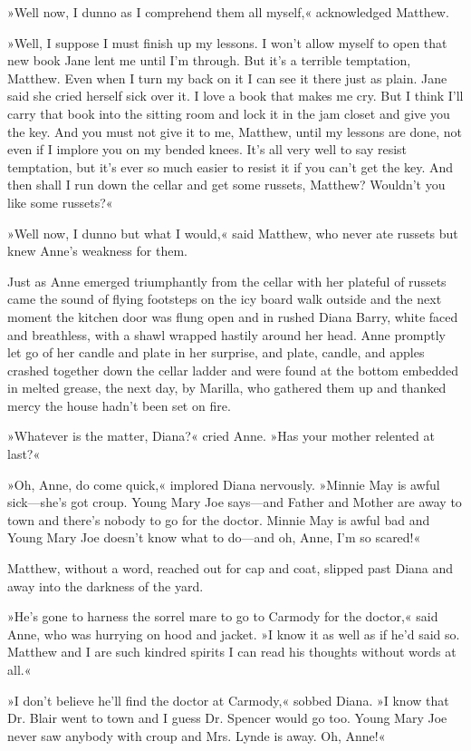 »Well now, I dunno as I comprehend them all myself,« acknowledged Matthew.

»Well, I suppose I must finish up my lessons. I won’t allow myself to open that new book Jane lent me until I’m through. But it’s a terrible temptation, Matthew. Even when I turn my back on it I can see it there just as plain. Jane said she cried herself sick over it. I love a book that makes me cry. But I think I’ll carry that book into the sitting room and lock it in the jam closet and give you the key. And you must not give it to me, Matthew, until my lessons are done, not even if I implore you on my bended knees. It’s all very well to say resist temptation, but it’s ever so much easier to resist it if you can’t get the key. And then shall I run down the cellar and get some russets, Matthew? Wouldn’t you like some russets?«

»Well now, I dunno but what I would,« said Matthew, who never ate russets but knew Anne’s weakness for them.

Just as Anne emerged triumphantly from the cellar with her plateful of russets came the sound of flying footsteps on the icy board walk outside and the next moment the kitchen door was flung open and in rushed Diana Barry, white faced and breathless, with a shawl wrapped hastily around her head. Anne promptly let go of her candle and plate in her surprise, and plate, candle, and apples crashed together down the cellar ladder and were found at the bottom embedded in melted grease, the next day, by Marilla, who gathered them up and thanked mercy the house hadn’t been set on fire.

»Whatever is the matter, Diana?« cried Anne. »Has your mother relented at last?«

»Oh, Anne, do come quick,« implored Diana nervously. »Minnie May is awful sick—she’s got croup. Young Mary Joe says—and Father and Mother are away to town and there’s nobody to go for the doctor. Minnie May is awful bad and Young Mary Joe doesn’t know what to do—and oh, Anne, I’m so scared!«

Matthew, without a word, reached out for cap and coat, slipped past Diana and away into the darkness of the yard.

»He’s gone to harness the sorrel mare to go to Carmody for the doctor,« said Anne, who was hurrying on hood and jacket. »I know it as well as if he’d said so. Matthew and I are such kindred spirits I can read his thoughts without words at all.«

»I don’t believe he’ll find the doctor at Carmody,« sobbed Diana. »I know that Dr. Blair went to town and I guess Dr. Spencer would go too. Young Mary Joe never saw anybody with croup and Mrs. Lynde is away. Oh, Anne!«

